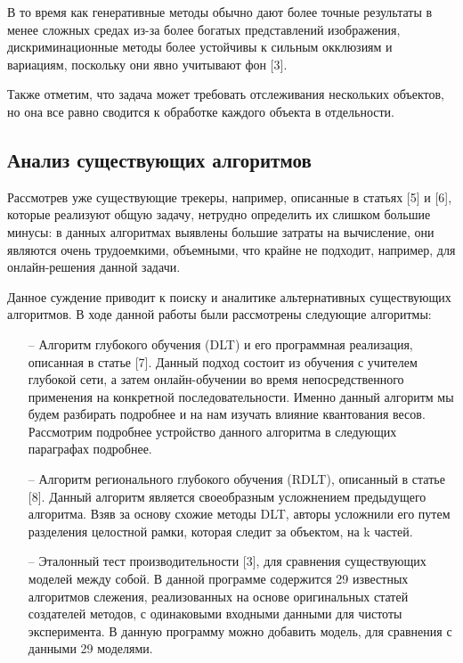 \documentclass[14pt, a4paper]{article}
\begin{document}
В то время как генеративные методы обычно дают более точные результаты в менее сложных средах из-за более богатых представлений изображения, дискриминационные методы более устойчивы к сильным окклюзиям и вариациям, поскольку они явно учитывают фон [3].

Также отметим, что задача может требовать отслеживания нескольких объектов, но она все равно сводится к обработке каждого объекта в отдельности.

\subsection{Анализ существующих алгоритмов}

Рассмотрев уже существующие трекеры, например, описанные  в статьях [5] и [6], которые реализуют общую задачу, нетрудно определить их слишком большие минусы: в данных алгоритмах выявлены большие затраты на вычисление, они являются очень трудоемкими, объемными, что крайне не подходит, например, для онлайн-решения данной задачи.

Данное суждение приводит к поиску и аналитике альтернативных существующих алгоритмов. В ходе данной работы были рассмотрены следующие алгоритмы:

\begin{itemize}[leftmargin=0em, itemindent=2.5 em,itemsep=1.5 pt,parsep=1.5 pt]

\item[--] Алгоритм глубокого обучения (DLT) и его программная реализация, описанная в статье [7]. Данный подход состоит из обучения с учителем глубокой сети, а затем онлайн-обучении во время непосредственного применения на конкретной последовательности. Именно данный алгоритм мы будем разбирать подробнее и на нам изучать влияние квантования весов. Рассмотрим подробнее устройство данного алгоритма в следующих параграфах подробнее.

\item[--] Алгоритм регионального глубокого обучения (RDLT), описанный в статье [8]. Данный алгоритм является своеобразным усложнением предыдущего алгоритма. Взяв за основу схожие методы DLT, авторы усложнили его путем разделения целостной рамки, которая следит за объектом, на k частей.

\item[--] Эталонный тест производительности [3], для сравнения существующих моделей между собой. В данной программе содержится 29 известных алгоритмов слежения, реализованных на основе оригинальных статей создателей методов, с одинаковыми  входными данными для чистоты эксперимента. В данную программу можно добавить модель, для сравнения с данными 29 моделями.  

\end{itemize}
\end{document}
